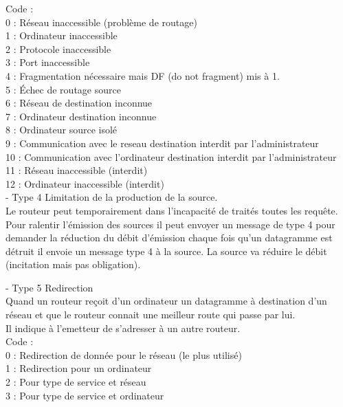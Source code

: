\documentclass{article}
\begin{document}
Code : \\
0 : Réseau inaccessible (problème de routage) \\
1 : Ordinateur inaccessible \\
2 : Protocole inaccessible \\
3 : Port inaccessible \\
4 : Fragmentation nécessaire mais DF (do not fragment) mis à 1. \\
5 : Échec de routage source \\ 
6 : Réseau de destination inconnue \\
7 : Ordinateur destination inconnue \\
8 : Ordinateur source isolé \\
9 : Communication avec le reseau destination interdit par l'administrateur \\
10 : Communication avec l'ordinateur destination interdit par l'administrateur \\ 
11 : Réseau inaccessible  (interdit) \\
12 : Ordinateur inaccessible (interdit) 
\\

- Type 4 Limitation de la production de la source. \\
Le routeur peut temporairement dans l'incapacité de traités toutes les requête. Pour ralentir l'émission des sources il peut envoyer un message de type 4 pour demander la réduction du débit d'émission chaque fois qu'un datagramme est détruit il envoie un message type 4 à la source. La source va réduire le débit (incitation mais pas obligation).
\\
\newpage

- Type 5 Redirection \\
Quand un routeur reçoit d'un ordinateur un datagramme à destination d'un réseau et que le routeur connait une meilleur route qui passe par lui. \\
Il indique à l'emetteur de s'adresser à un autre routeur. 
\\

Code : \\
0 : Redirection de donnée pour le réseau (le plus utilisé) \\
1 : Redirection pour un ordinateur \\
2 : Pour type de service et réseau \\
3 : Pour type de service et ordinateur \\
\\
\end{document}
